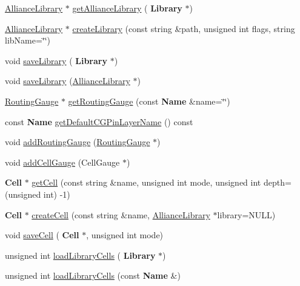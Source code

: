 \begin{DoxyCompactItemize}
\item 
\mbox{\hyperlink{classCRL_1_1AllianceLibrary}{Alliance\+Library}} $\ast$ \mbox{\hyperlink{classCRL_1_1AllianceFramework_a8e007b3f2ac45feec2907f77530a718c}{get\+Alliance\+Library}} (\textbf{ Library} $\ast$)
\item 
\mbox{\hyperlink{classCRL_1_1AllianceLibrary}{Alliance\+Library}} $\ast$ \mbox{\hyperlink{classCRL_1_1AllianceFramework_a4efc06e6a6d5413398946453c3fd6649}{create\+Library}} (const string \&path, unsigned int flags, string lib\+Name=\char`\"{}\char`\"{})
\item 
void \mbox{\hyperlink{classCRL_1_1AllianceFramework_a5e5a3d137a2c141bf8984877b7f7d18a}{save\+Library}} (\textbf{ Library} $\ast$)
\item 
void \mbox{\hyperlink{classCRL_1_1AllianceFramework_afe7a103d54e865511fd55af90eddcf4e}{save\+Library}} (\mbox{\hyperlink{classCRL_1_1AllianceLibrary}{Alliance\+Library}} $\ast$)
\item 
\mbox{\hyperlink{classCRL_1_1RoutingGauge}{Routing\+Gauge}} $\ast$ \mbox{\hyperlink{classCRL_1_1AllianceFramework_ae102d655820c5d0a29a0200c5e83d42c}{get\+Routing\+Gauge}} (const \textbf{ Name} \&name=\char`\"{}\char`\"{})
\item 
const \textbf{ Name} \mbox{\hyperlink{classCRL_1_1AllianceFramework_ae2bf20fc92a4684bebdab666c68c8aab}{get\+Default\+C\+G\+Pin\+Layer\+Name}} () const
\item 
void \mbox{\hyperlink{classCRL_1_1AllianceFramework_ae182fd150c695fd24c1b10ddbc377b32}{add\+Routing\+Gauge}} (\mbox{\hyperlink{classCRL_1_1RoutingGauge}{Routing\+Gauge}} $\ast$)
\item 
void \mbox{\hyperlink{classCRL_1_1AllianceFramework_aab16db33a0ce2e3bce5739f7cadb3d5a}{add\+Cell\+Gauge}} (Cell\+Gauge $\ast$)
\item 
\textbf{ Cell} $\ast$ \mbox{\hyperlink{classCRL_1_1AllianceFramework_a329d04c188668968308108523d16e2be}{get\+Cell}} (const string \&name, unsigned int mode, unsigned int depth=(unsigned int) -\/1)
\item 
\textbf{ Cell} $\ast$ \mbox{\hyperlink{classCRL_1_1AllianceFramework_ac4381ad0c3799d584ef3ea160846e2bb}{create\+Cell}} (const string \&name, \mbox{\hyperlink{classCRL_1_1AllianceLibrary}{Alliance\+Library}} $\ast$library=N\+U\+LL)
\item 
void \mbox{\hyperlink{classCRL_1_1AllianceFramework_abb34a606c7cd21638b4439701a8dcef9}{save\+Cell}} (\textbf{ Cell} $\ast$, unsigned int mode)
\item 
unsigned int \mbox{\hyperlink{classCRL_1_1AllianceFramework_a2e43b1928a05eea4b2dc1fe0757e4865}{load\+Library\+Cells}} (\textbf{ Library} $\ast$)
\item 
unsigned int \mbox{\hyperlink{classCRL_1_1AllianceFramework_adc8acedeb9daa37b4ab2dee0717835fa}{load\+Library\+Cells}} (const \textbf{ Name} \&)
\end{DoxyCompactItemize}
